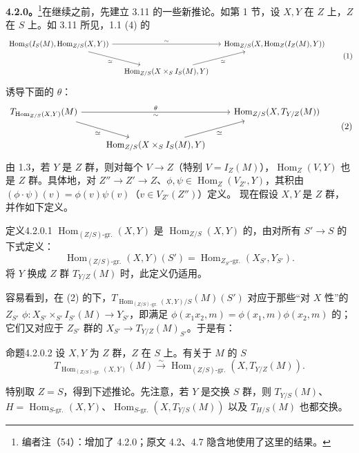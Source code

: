\textbf{4.2.0。}\footnote{编者注（54）：增加了 4.2.0；原文 4.2、4.7 隐含地使用了这里的结果。}在继续之前，先建立 3.11 的一些新推论。如第 1 节，设 $X,Y$ 在 $Z$ 上，$Z$ 在 $S$ 上。如 3.11 所见，1.1 (4) 的
\[\begin{tikzcd}[column sep=small]
\operatorname{Hom}_S(I_S(M),\operatorname{Hom}_{Z/S}(X,Y))\arrow[rr,"\sim"]\arrow[dr,"\simeq"']&&\operatorname{Hom}_{Z/S}(X,\operatorname{Hom}_Z(I_Z(M),Y))\\
&\operatorname{Hom}_{Z/S}(X\times_SI_S(M),Y)\arrow[ur,"\simeq"']&
\end{tikzcd}\tag{1}\]
诱导下面的 $\theta$：
\[\begin{tikzcd}
T_{\operatorname{Hom}_{Z/S}(X,Y)}(M)\arrow[rr,"\theta", "\sim"']\arrow[dr,"\simeq"']&&\operatorname{Hom}_{Z/S}(X,T_{Y/Z}(M))\\
&\operatorname{Hom}_{Z/S}(X\times_SI_S(M),Y)\arrow[ur,"\simeq"']&
\end{tikzcd}\tag{2}\]
由 1.3，若 $Y$ 是 $Z$ 群，则对每个 $V\to Z$（特别 $V=I_Z(M)$），$\operatorname{Hom}_Z(V,Y)$ 也是 $Z$ 群。具体地，对 $Z''\to Z'\to Z$、$\phi,\psi\in\operatorname{Hom}_Z(V_{Z'},Y)$，其积由
$(\phi\cdot\psi)(v)=\phi(v)\psi(v)$（$v\in V_{Z'}(Z'')$）定义。
现在假设 $X,Y$ 是 $Z$ 群，并作如下定义。
\begin{SGAresult}{定义}{4.2.0.1}
$\operatorname{Hom}_{(Z/S)\text{-gr.}}(X,Y)$ 是 $\operatorname{Hom}_{Z/S}(X,Y)$ 的，由对所有 $S'\to S$ 的下式定义：
\[\operatorname{Hom}_{(Z/S)\text{-gr.}}(X,Y)(S')=\operatorname{Hom}_{Z_{S'}\text{-gr.}}(X_{S'},Y_{S'}).\tag{3}\]
将 $Y$ 换成 $Z$ 群 $T_{Y/Z}(M)$ 时，此定义仍适用。
\end{SGAresult}
容易看到，在 (2) 的下，$T_{\operatorname{Hom}_{(Z/S)\text{-gr.}}(X,Y)/S}(M)(S')$ 对应于那些“对 $X$ 性”的 $Z_{S'}$ 
$\phi:X_{S'}\times_{S'}I_{S'}(M)\to Y_{S'}$，即满足 $\phi(x_1x_2,m)=\phi(x_1,m)\phi(x_2,m)$ 的；它们又对应于 $Z_{S'}$ 群的 $X_{S'}\to T_{Y/Z}(M)_{S'}$。于是有：
\begin{SGAresult}{命题}{4.2.0.2}
设 $X,Y$ 为 $Z$ 群，$Z$ 在 $S$ 上。有关于 $M$ 的 $S$ 
\[T_{\operatorname{Hom}_{(Z/S)\text{-gr.}}(X,Y)}(M)\xrightarrow{\sim}\operatorname{Hom}_{(Z/S)\text{-gr.}}(X,T_{Y/Z}(M)).\]
\end{SGAresult}
特别取 $Z=S$，得到下述推论。先注意，若 $Y$ 是交换 $S$ 群，则 $T_{Y/S}(M)$、$H=\operatorname{Hom}_{S\text{-gr.}}(X,Y)$、$\operatorname{Hom}_{S\text{-gr.}}(X,T_{Y/S}(M))$ 以及 $T_{H/S}(M)$ 也都交换。
